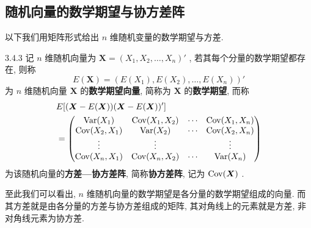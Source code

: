 	\subsection{随机向量的数学期望与协方差阵}\label{ssec:3.4.5}
	以下我们用矩阵形式给出 $n$ 维随机变量的数学期望与方差.
	\begin{definition}{}{3.4.3}
		记 $n$ 维随机向量为 $\boldsymbol{X}=(X_1,X_2,\ldots,X_n)'$ , 若其每个分量的数学期望都存在, 则称
		\begin{equation*}
			E(\boldsymbol{X})=(E(X_1),E(X_2),\ldots,E(X_n))'
		\end{equation*}
		为 $n$ 维随机向量 $\boldsymbol{X}$ 的\textbf{数学期望向量}, 简称为 $\boldsymbol{X}$ 的\textbf{数学期望}, 而称
		\begin{align*}
			&E[ (\boldsymbol{X}-E(\boldsymbol{X})) (\boldsymbol{X}-E(\boldsymbol{X}))' ]\\
			&=\begin{pmatrix}
				\operatorname{Var}(X_1) & \operatorname{Cov}(X_1,X_2) & \cdots & \operatorname{Cov}(X_1,X_n)\\
				\operatorname{Cov}(X_2,X_1) & \operatorname{Var}(X_2) & \cdots & \operatorname{Cov}(X_2,X_n)\\
				\vdots & \vdots & &\vdots\\
				\operatorname{Cov}(X_n,X_1) & \operatorname{Cov}(X_n,X_2) & \cdots & \operatorname{Var}(X_n)
			\end{pmatrix}
		\end{align*}
		为该随机向量的\textbf{方差—协方差阵}, 简称\textbf{协方差阵}, 记为 $\operatorname{Cov}(\boldsymbol{X})$ .
	\end{definition}
	至此我们可以看出, $n$ 维随机向量的数学期望是各分量的数学期望组成的向量. 而其方差就是由各分量的方差与协方差组成的矩阵, 其对角线上的元素就是方差, 非对角线元素为协方差.

